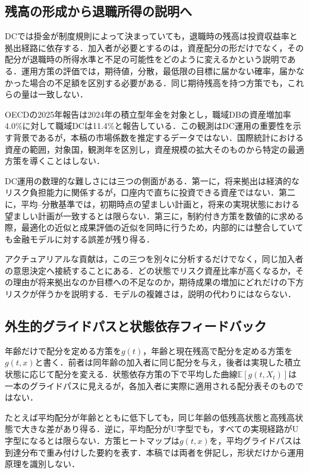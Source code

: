 \documentclass[11pt,a4paper]{article}
\numberwithin{equation}{section}
\numberwithin{table}{section}
\numberwithin{figure}{section}
\theoremstyle{plain}
\theoremstyle{definition}
\newcommand{\E}{\mathbb{E}}
\begin{document}
\subsection{残高の形成から退職所得の説明へ}
DCでは掛金が制度規則によって決まっていても，退職時の残高は投資収益率と拠出経路に依存する．加入者が必要とするのは，資産配分の形だけでなく，その配分が退職時の所得水準と不足の可能性をどのように変えるかという説明である．運用方策の評価では，期待値，分散，最低限の目標に届かない確率，届かなかった場合の不足額を区別する必要がある．同じ期待残高を持つ方策でも，これらの量は一致しない．

OECDの2025年報告は2024年の積立型年金を対象とし，職域DBの資産増加率4.0\%に対して職域DCは11.4\%と報告している\citep{OECD2025PensionMarkets}．この観測はDC運用の重要性を示す背景であるが，本稿の市場係数を推定するデータではない．国際統計における資産の範囲，対象国，観測年を区別し，資産規模の拡大そのものから特定の最適方策を導くことはしない．

DC運用の数理的な難しさには三つの側面がある．第一に，将来拠出は経済的なリスク負担能力に関係するが，口座内で直ちに投資できる資産ではない．第二に，平均--分散基準では，初期時点の望ましい計画と，将来の実現状態における望ましい計画が一致するとは限らない．第三に，制約付き方策を数値的に求める際，最適化の近似と成果評価の近似を同時に行うため，内部的には整合していても金融モデルに対する誤差が残り得る．

アクチュアリアルな貢献は，この三つを別々に分析するだけでなく，同じ加入者の意思決定へ接続することにある．どの状態でリスク資産比率が高くなるか，その理由が将来拠出なのか目標への不足なのか，期待成果の増加にどれだけの下方リスクが伴うかを説明する．モデルの複雑さは，説明の代わりにはならない．

\subsection{外生的グライドパスと状態依存フィードバック}
年齢だけで配分を定める方策を$g(t)$，年齢と現在残高で配分を定める方策を$g(t,x)$と書く．前者は同年齢の加入者に同じ配分を与え，後者は実現した積立状態に応じて配分を変える．状態依存方策の下で平均した曲線$\E[g(t,X_t)]$は一本のグライドパスに見えるが，各加入者に実際に適用される配分表そのものではない．

たとえば平均配分が年齢とともに低下しても，同じ年齢の低残高状態と高残高状態で大きな差があり得る．逆に，平均配分がU字型でも，すべての実現経路がU字型になるとは限らない．方策ヒートマップは$g(t,x)$を，平均グライドパスは到達分布で重み付けした要約を表す．本稿では両者を併記し，形状だけから運用原理を識別しない．
\end{document}
